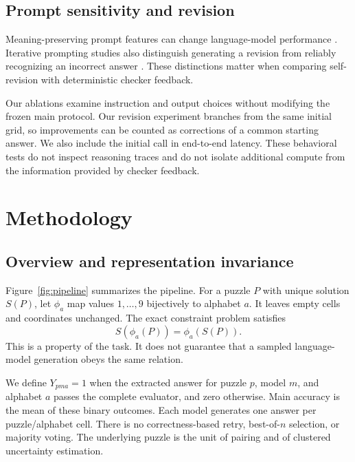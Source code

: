 \documentclass[11pt]{article}
\begin{document}
\subsection{Prompt sensitivity and revision}
Meaning-preserving prompt features can change language-model performance \citep{sclar2024formatting}. Iterative prompting studies also distinguish generating a revision from reliably recognizing an incorrect answer \citep{stechly2023wrong,huang2024selfcorrect}. These distinctions matter when comparing self-revision with deterministic checker feedback.

Our ablations examine instruction and output choices without modifying the frozen main protocol. Our revision experiment branches from the same initial grid, so improvements can be counted as corrections of a common starting answer. We also include the initial call in end-to-end latency. These behavioral tests do not inspect reasoning traces and do not isolate additional compute from the information provided by checker feedback.

\section{Methodology}
\subsection{Overview and representation invariance}
Figure~\ref{fig:pipeline} summarizes the pipeline. For a puzzle $P$ with unique solution $S(P)$, let $\phi_a$ map values $1,\ldots,9$ bijectively to alphabet $a$. It leaves empty cells and coordinates unchanged. The exact constraint problem satisfies
\begin{equation}
 S(\phi_a(P))=\phi_a(S(P)).
\end{equation}
This is a property of the task. It does not guarantee that a sampled language-model generation obeys the same relation.

We define $Y_{pma}=1$ when the extracted answer for puzzle $p$, model $m$, and alphabet $a$ passes the complete evaluator, and zero otherwise. Main accuracy is the mean of these binary outcomes. Each model generates one answer per puzzle/alphabet cell. There is no correctness-based retry, best-of-$n$ selection, or majority voting. The underlying puzzle is the unit of pairing and of clustered uncertainty estimation.
\end{document}
